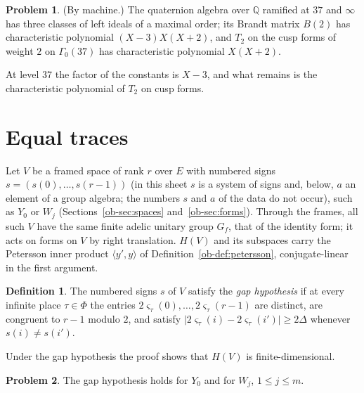 \documentclass[reqno]{amsart}
\theoremstyle{plain}
\theoremstyle{definition}
\newtheorem{problem}{Problem}[section]
\newtheorem{definition}[theorem]{Definition}
\newcommand{\Q}{\mathbb{Q}}
\begin{document}
\begin{problem}\label{pr:level37}
(By machine.)  The quaternion algebra over \(\Q\) ramified at \(37\) and \(\infty\) has three classes of left ideals of a maximal order; its Brandt matrix \(B(2)\) has characteristic polynomial \((X - 3)X(X + 2)\), and \(T_2\) on the cusp forms of weight \(2\) on \(\Gamma_0(37)\) has characteristic polynomial \(X(X + 2)\).
\end{problem}

At level \(37\) the factor of the constants is \(X - 3\), and what remains is the characteristic polynomial of \(T_2\) on cusp forms.

\section{Equal traces}\label{sec:traces}

Let \(V\) be a framed space of rank \(r\) over \(E\) with numbered signs \(s = (s(0), \dots, s(r-1))\) (in this sheet \(s\) is a system of signs and, below, \(a\) an element of a group algebra; the numbers \(s\) and \(a\) of the data do not occur), such as \(Y_0\) or \(W_j\) (Sections~\ref{ob-sec:spaces} and~\ref{ob-sec:forms}).  Through the frames, all such \(V\) have the same finite adelic unitary group \(G_f\), that of the identity form; it acts on forms on \(V\) by right translation.  \(H(V)\) and its subspaces carry the Petersson inner product \(\langle y', y\rangle\) of Definition~\ref{ob-def:petersson}, conjugate-linear in the first argument.

\begin{definition}\label{def:gap}
The numbered signs \(s\) of \(V\) satisfy the \emph{gap hypothesis} if at every infinite place \(\tau \in \Phi\) the entries \(2\varsigma_\tau(0), \dots, 2\varsigma_\tau(r-1)\) are distinct, are congruent to \(r - 1\) modulo \(2\), and satisfy \(\lvert 2\varsigma_\tau(i) - 2\varsigma_\tau(i')\rvert \ge 2\Delta\) whenever \(s(i) \ne s(i')\).
\end{definition}

Under the gap hypothesis the proof shows that \(H(V)\) is finite-dimensional.

\begin{problem}\label{pr:gap-Y-W}
The gap hypothesis holds for \(Y_0\) and for \(W_j\), \(1 \le j \le m\).
\end{problem}
\end{document}
